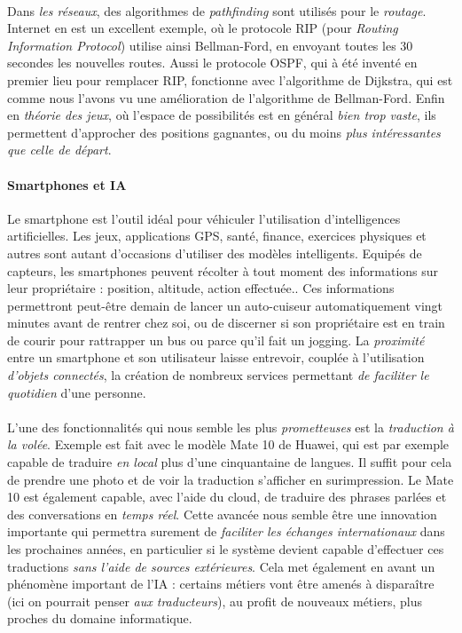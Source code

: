 \paragraph{} Dans \emph{les réseaux}, des algorithmes de \emph{pathfinding} sont utilisés pour le \emph{routage}. Internet
en est un excellent exemple, où le protocole RIP (pour \emph{Routing Information Protocol}) utilise ainsi Bellman-Ford, en
envoyant toutes les 30 secondes les nouvelles routes. \cite{AI1} Aussi le protocole OSPF, qui à été inventé en premier lieu
pour remplacer RIP, fonctionne avec l'algorithme de Dijkstra, qui est comme nous l'avons vu une amélioration de l'algorithme
de Bellman-Ford. Enfin en \emph{théorie des jeux}, où l'espace de possibilités est en général \emph{bien trop vaste}, ils
permettent d'approcher des positions gagnantes, ou du moins \emph{plus intéressantes que celle de départ}.

\paragraph{Smartphones et IA} Le smartphone est l'outil idéal pour véhiculer l'utilisation d'intelligences artificielles. Les jeux,
applications GPS, santé, finance, exercices physiques et autres sont autant d'occasions d'utiliser des modèles intelligents. Equipés de capteurs,
les smartphones peuvent récolter à tout moment des informations sur leur propriétaire : position, altitude, action effectuée.. Ces informations
permettront peut-être demain de lancer un auto-cuiseur automatiquement vingt minutes avant de rentrer chez soi, ou de discerner si son 
propriétaire est en train de courir pour rattrapper un bus ou parce qu'il fait un jogging. \cite{Smartphone0} La \emph{proximité} entre 
un smartphone et son utilisateur laisse entrevoir, couplée à l'utilisation \emph{d'objets connectés}, la création de nombreux services
permettant \emph{de faciliter le quotidien} d'une personne. 

\paragraph{} L'une des fonctionnalités qui nous semble les plus \emph{prometteuses} est la \emph{traduction à la volée}. Exemple est fait
avec le modèle Mate 10 de Huawei, qui est par exemple capable de traduire \emph{en local} plus d'une cinquantaine de langues. Il suffit pour
cela de prendre une photo et de voir la traduction s'afficher en surimpression. \cite{Smartphone0} Le Mate 10 est également capable,
avec l'aide du cloud, de traduire des phrases parlées et des conversations en \emph{temps réel}. Cette avancée nous semble être une innovation
importante qui permettra surement de \emph{faciliter les échanges internationaux} dans les prochaines années, en particulier si le système devient
capable d'effectuer ces traductions \emph{sans l'aide de sources extérieures}. Cela met également en avant un phénomène important de l'IA : 
certains métiers vont être amenés à disparaître (ici on pourrait penser \emph{aux traducteurs}), au profit de nouveaux métiers, plus proches du
domaine informatique.

